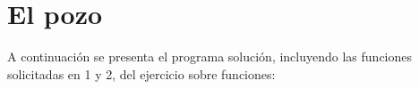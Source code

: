 \section{El pozo}

  A continuación se presenta el programa solución, incluyendo las funciones solicitadas en 1 y 2, del ejercicio sobre funciones:
  
  
